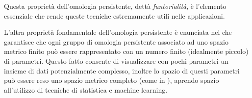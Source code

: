  Questa proprietà dell'omologia persistente, dettà \emph{funtorialità}, è l'elemento essenziale che rende queste tecniche estremamente utili nelle applicazioni.

 L'altra proprietà fondamentale dell'omologia persistente è enunciata nel  che garantisce che ogni gruppo di omologia persistente associato ad uno spazio metrico finito può essere rappresentato con un numero finito (idealmente piccolo) di parametri. Questo fatto consente di visualizzare con pochi parametri un insieme di dati potenzialmente complesso, inoltre lo spazio di questi parametri può essere reso uno spazio metrico completo (come in \cite{Kwitt2015}), aprendo spazio all'utilizzo di tecniche di statistica e machine learning.
